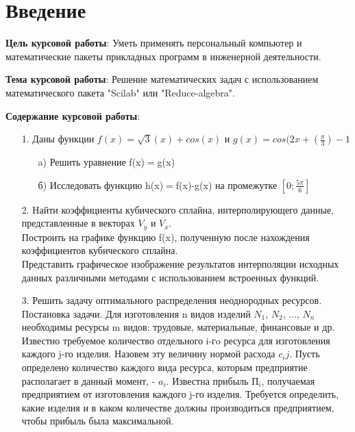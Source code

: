 \documentclass[russian,utf8,nocolumnxxxi,nocolumnxxxii]{eskdtext}
\begin{document}
\maketitle

\newpage
\tableofcontents

\newpage

\section{Введение}

\textbf{Цель курсовой работы}: Уметь применять персональный компьютер и математические пакеты прикладных программ в инженерной деятельности.

\textbf{Тема курсовой работы}: Решение математических задач с использованием математического пакета
"Scilab" или "Reduce-algebra".

\textbf{Содержание курсовой работы}:
\begin{enumerate}
    \item[1.] Даны функции $f(x)=\sqrt{3}(x)+cos(x)$ и $g(x)=cos(2x+(\frac{\pi}{3})-1$
\begin{enumerate}
    \item[a)] Решить уравнение f(x)$=$g(x)
    \item[б)] Исследовать функцию h(x)$=$f(x)-g(x) на промежутке $[0;\frac{5\pi}{6}]$
\end{enumerate}
    \item[2.] Найти коэффициенты кубического сплайна, интерполирующего данные, представленные в векторах $V_y$ и $V_x$.
    \\Построить на графике функцию f(x), полученную после нахождения коэффициентов кубического сплайна.
    \\Представить графическое изображение результатов интерполяции исходных данных различными методами с использованием встроенных функций.
    \item[3.]Решить задачу оптимального распределения неоднородных ресурсов. Постановка задачи. Для изготовления n видов изделий $N_1$, $N_2$, ..., $N_n$ необходимы ресурсы m видов: трудовые, материальные, финансовые и др. Известно требуемое количество отдельного i-гo ресурса для изготовления каждого j-го изделия. Назовем эту величину нормой расхода  $c_ij$. Пусть определено количество каждого вида ресурса, которым предприятие располагает в данный момент, - $a_i$. Известна прибыль $П_i$, получаемая предприятием от изготовления каждого j-го изделия. Требуется определить, какие изделия и в каком количестве должны производиться предприятием, чтобы прибыль была максимальной.
\end{enumerate}
\end{document}

